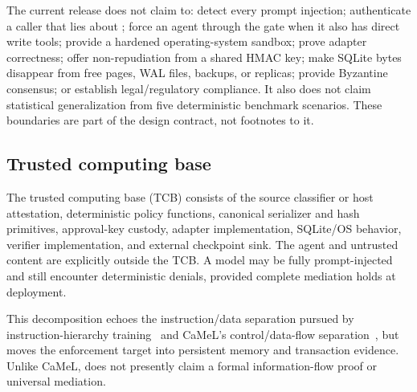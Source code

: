 The current release does not claim to: detect every prompt injection; authenticate a caller that lies about ; force an agent through the gate when it also has direct write tools; provide a hardened operating-system sandbox; prove adapter correctness; offer non-repudiation from a shared HMAC key; make SQLite bytes disappear from free pages, WAL files, backups, or replicas; provide Byzantine consensus; or establish legal/regulatory compliance. It also does not claim statistical generalization from five deterministic benchmark scenarios. These boundaries are part of the design contract, not footnotes to it.

\subsection{Trusted computing base}

The trusted computing base (TCB) consists of the source classifier or host attestation, deterministic policy functions, canonical serializer and hash primitives, approval-key custody, adapter implementation, SQLite/OS behavior, verifier implementation, and external checkpoint sink. The agent and untrusted content are explicitly outside the TCB. A model may be fully prompt-injected and still encounter deterministic denials, provided complete mediation holds at deployment.

This decomposition echoes the instruction/data separation pursued by instruction-hierarchy training~\cite{wallace2024hierarchy} and CaMeL's control/data-flow separation~\cite{debenedetti2025camel}, but moves the enforcement target into persistent memory and transaction evidence. Unlike CaMeL, \system{} does not presently claim a formal information-flow proof or universal mediation.

